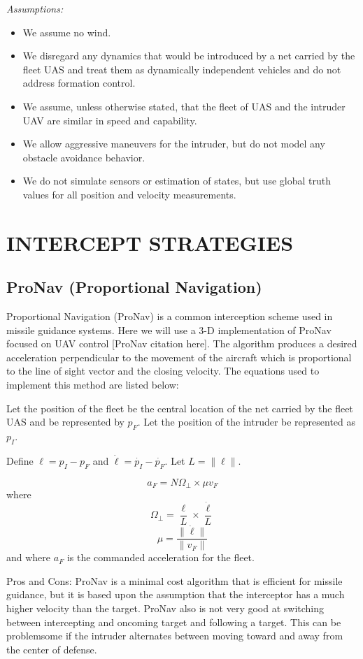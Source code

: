 \documentclass[letterpaper, 10 pt, conference]{ieeeconf}  %
\begin{document}
{\em Assumptions:}
\begin{itemize}
\item We assume no wind. 
\item We disregard any dynamics that would be introduced by a net carried by the fleet UAS and treat them as dynamically independent vehicles and do not address formation control. 
\item We assume, unless otherwise stated, that the fleet of UAS and the intruder UAV are similar in speed and capability.
\item We allow aggressive maneuvers for the intruder, but do not model any obstacle avoidance behavior.
\item We do not simulate sensors or estimation of states, but use global truth values for all position and velocity measurements.
\end{itemize}

\section{INTERCEPT STRATEGIES}

\subsection{ProNav (Proportional Navigation)}
Proportional Navigation (ProNav) is a common interception scheme used in missile guidance systems. Here we will use a 3-D implementation of ProNav focused on UAV control [ProNav citation here]. The algorithm produces a desired acceleration perpendicular to the movement of the aircraft which is proportional to the line of sight vector and the closing velocity. The equations used to implement this method are listed below:


Let the position of the fleet be the central location of the net carried by the fleet UAS and be represented by \(p_F\). Let the position of the intruder be represented as \(p_I\).

Define \(\ell = p_I - p_F\) and \(\dot{\ell} = \dot{p_I} - \dot{p_F}\). Let $L = \|\ell\|$.

\[
	a_F = N\Omega_\perp \times \mu v_F
\]
where
\[
	\Omega_\perp = \frac{\ell}{L} \times \frac{\dot{\ell}}{L}
\]
\[
	\mu = \frac{\|\dot{\ell}\|}{\|v_F\|}
\]
and where $a_F$ is the commanded acceleration for the fleet.

Pros and Cons: ProNav is a minimal cost algorithm that is efficient for missile guidance, but it is based upon the assumption that the interceptor has a much higher velocity than the target. ProNav also is not very good at switching between intercepting and oncoming target and following a target. This can be problemsome if the intruder alternates between moving toward and away from the center of defense.
\end{document}
